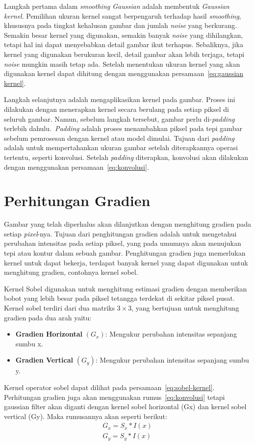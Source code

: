     Langkah pertama dalam \emph{smoothing Gaussian} adalah membentuk \emph{Gaussian kernel}. Pemilihan ukuran kernel sangat berpengaruh terhadap hasil \emph{smoothing}, khususnya pada tingkat kehalusan gambar dan jumlah \emph{noise} yang berkurang.
Semakin besar kernel yang digunakan, semakin banyak \emph{noise} yang dihilangkan, tetapi hal ini dapat menyebabkan detail gambar ikut terhapus. Sebaliknya, jika kernel yang digunakan berukuran kecil, detail gambar akan lebih terjaga, tetapi \emph{noise} mungkin masih tetap ada.
Setelah menentukan ukuran kernel yang akan digunakan kernel dapat dihitung dengan menggunakan persamaan~\eqref{eq:gaussian kernel}.

    Langkah selanjutnya adalah mengaplikasikan kernel pada gambar. Proses ini dilakukan dengan menerapkan kernel secara berulang pada setiap piksel di seluruh gambar.
Namun, sebelum langkah tersebut, gambar perlu di-\emph{padding} terlebih dahulu.~\emph{Padding} adalah proses menambahkan piksel pada tepi gambar sebelum pemrosesan dengan kernel atau model dimulai.
Tujuan dari \emph{padding} adalah untuk mempertahankan ukuran gambar setelah diterapkannya operasi tertentu, seperti konvolusi. 
Setelah \emph{padding} diterapkan, konvolusi akan dilakukan dengan menggunakan persamaan~\eqref{eq:konvolusi}. 

\section{Perhitungan Gradien}
    Gambar yang telah diperhalus akan dilanjutkan dengan menghitung gradien pada setiap \emph{pixel}-nya. Tujuan dari penghitungan gradien adalah untuk mengetahui perubahan intensitas pada setiap piksel, yang pada umumnya akan menujukan tepi atau kontur dalam sebuah gambar.
Penghitungan gradien juga memerlukan kernel untuk dapat bekerja, terdapat banyak kernel yang dapat digunakan untuk menghitung gradien, contohnya kernel sobel. 

    Kernel Sobel digunakan untuk menghitung estimasi gradien dengan memberikan bobot yang lebih besar pada piksel tetangga terdekat di sekitar piksel pusat.
Kernel sobel terdiri dari dua matriks \(3 \times 3\), yang bertujuan untuk menghitung gradien pada dua arah yaitu:
 \begin{itemize}
    \item \textbf{Gradien Horizontal} \((G_{x})\): Mengukur perubahan intensitas sepanjang sumbu x.
    \item \textbf{Gradien Vertical} \((G_{y})\): Mengukur perubahan intensitas sepanjang sumbu y.
\end{itemize}Kernel operator sobel dapat dilihat pada persamaan~\eqref{eq:sobel-kernel}. 
Perhitungan gradien juga akan menggunakan rumus~\eqref{eq:konvolusi} tetapi gaussian filter akan diganti dengan kernel sobel horizontal (Gx) dan kernel sobel vertical (Gy).
Maka rumusannya akan seperti berikut:
\begin{equation}
    \begin{aligned}
        G_{x} = S_{x} * I(x)\\ G_{y} = S_{y} * I(x)
    \end{aligned}
\end{equation}

